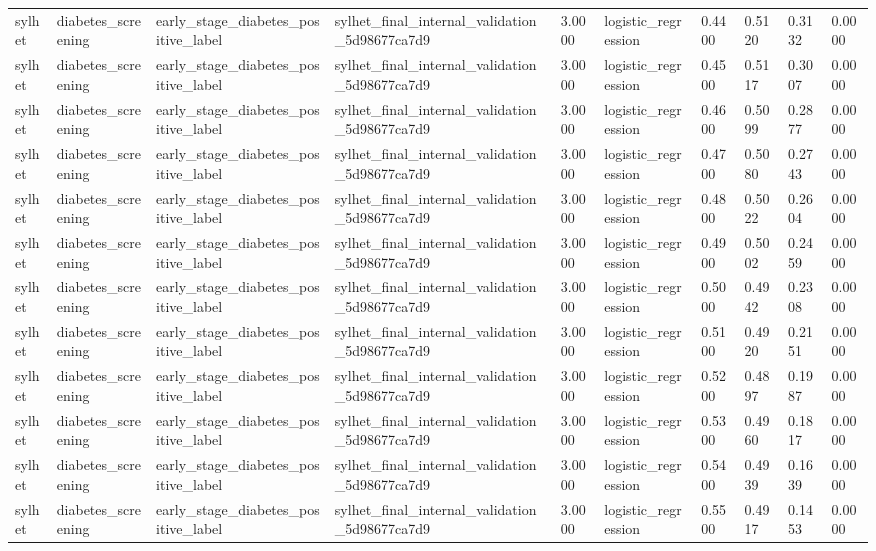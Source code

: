 \begin{tabular}{llllllllll}
sylhet & diabetes\_screening & early\_stage\_diabetes\_positive\_label & sylhet\_final\_internal\_validation\_5d98677ca7d9 & 3.0000 & logistic\_regression & 0.4400 & 0.5120 & 0.3132 & 0.0000 \\
sylhet & diabetes\_screening & early\_stage\_diabetes\_positive\_label & sylhet\_final\_internal\_validation\_5d98677ca7d9 & 3.0000 & logistic\_regression & 0.4500 & 0.5117 & 0.3007 & 0.0000 \\
sylhet & diabetes\_screening & early\_stage\_diabetes\_positive\_label & sylhet\_final\_internal\_validation\_5d98677ca7d9 & 3.0000 & logistic\_regression & 0.4600 & 0.5099 & 0.2877 & 0.0000 \\
sylhet & diabetes\_screening & early\_stage\_diabetes\_positive\_label & sylhet\_final\_internal\_validation\_5d98677ca7d9 & 3.0000 & logistic\_regression & 0.4700 & 0.5080 & 0.2743 & 0.0000 \\
sylhet & diabetes\_screening & early\_stage\_diabetes\_positive\_label & sylhet\_final\_internal\_validation\_5d98677ca7d9 & 3.0000 & logistic\_regression & 0.4800 & 0.5022 & 0.2604 & 0.0000 \\
sylhet & diabetes\_screening & early\_stage\_diabetes\_positive\_label & sylhet\_final\_internal\_validation\_5d98677ca7d9 & 3.0000 & logistic\_regression & 0.4900 & 0.5002 & 0.2459 & 0.0000 \\
sylhet & diabetes\_screening & early\_stage\_diabetes\_positive\_label & sylhet\_final\_internal\_validation\_5d98677ca7d9 & 3.0000 & logistic\_regression & 0.5000 & 0.4942 & 0.2308 & 0.0000 \\
sylhet & diabetes\_screening & early\_stage\_diabetes\_positive\_label & sylhet\_final\_internal\_validation\_5d98677ca7d9 & 3.0000 & logistic\_regression & 0.5100 & 0.4920 & 0.2151 & 0.0000 \\
sylhet & diabetes\_screening & early\_stage\_diabetes\_positive\_label & sylhet\_final\_internal\_validation\_5d98677ca7d9 & 3.0000 & logistic\_regression & 0.5200 & 0.4897 & 0.1987 & 0.0000 \\
sylhet & diabetes\_screening & early\_stage\_diabetes\_positive\_label & sylhet\_final\_internal\_validation\_5d98677ca7d9 & 3.0000 & logistic\_regression & 0.5300 & 0.4960 & 0.1817 & 0.0000 \\
sylhet & diabetes\_screening & early\_stage\_diabetes\_positive\_label & sylhet\_final\_internal\_validation\_5d98677ca7d9 & 3.0000 & logistic\_regression & 0.5400 & 0.4939 & 0.1639 & 0.0000 \\
sylhet & diabetes\_screening & early\_stage\_diabetes\_positive\_label & sylhet\_final\_internal\_validation\_5d98677ca7d9 & 3.0000 & logistic\_regression & 0.5500 & 0.4917 & 0.1453 & 0.0000 \\

\end{tabular}
